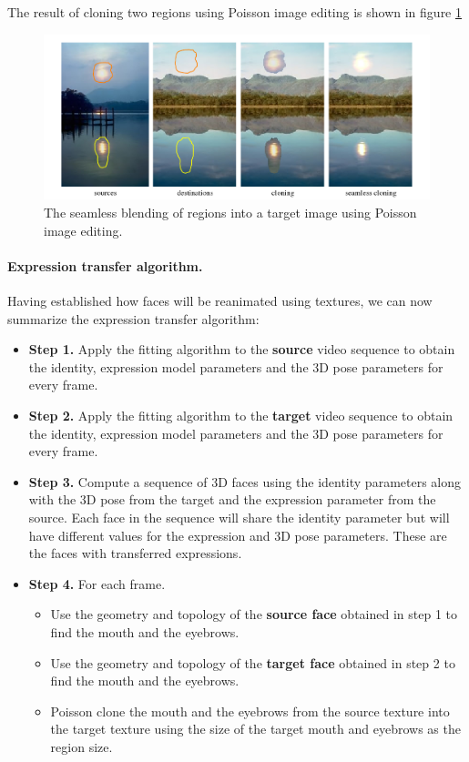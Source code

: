 \documentclass[11pt,a4paper,twoside]{report}
\begin{document}
The result of cloning two regions using Poisson image editing is shown in figure \ref{fg:poisson}
\begin{figure}[H]
\begin{centering}
\includegraphics[scale=0.55]{images/cloning.png}
\par\end{centering}

\caption{The seamless blending of regions into a target image using Poisson
  image editing.}
\label{fg:poisson}

\end{figure}

\paragraph{Expression transfer algorithm.}Having established how faces will be reanimated using textures, we can now
summarize the expression transfer algorithm:
\begin{itemize}
\item \textbf{Step 1.} Apply the fitting algorithm to the \textbf{source} video sequence
  to obtain the identity, expression model parameters and the 3D pose parameters
  for every frame.
\item \textbf{Step 2.} Apply the fitting algorithm to the \textbf{target} video sequence
  to obtain the identity, expression model parameters and the 3D pose
  parameters for every frame.
\item \textbf{Step 3.} Compute a sequence of 3D faces using the identity
  parameters along with the 3D pose from the target and the expression parameter
  from the source. Each face in the sequence will share the identity parameter
  but will have different values for the expression and 3D pose
  parameters. These are the faces with transferred expressions.
\item \textbf{Step 4.} For each frame.
\begin{itemize}
\item[\textbullet] Use the geometry and topology of the \textbf{source face} obtained in step 1 to
  find the mouth and the eyebrows.
\item[\textbullet] Use the geometry and topology of the \textbf{target face} obtained in step 2 to
  find the mouth and the eyebrows.
\item[\textbullet] Poisson clone the mouth and the eyebrows from the source texture into
  the target texture using the size of the target mouth and eyebrows as the
  region size.
\end{itemize}
\end{itemize}
\end{document}
